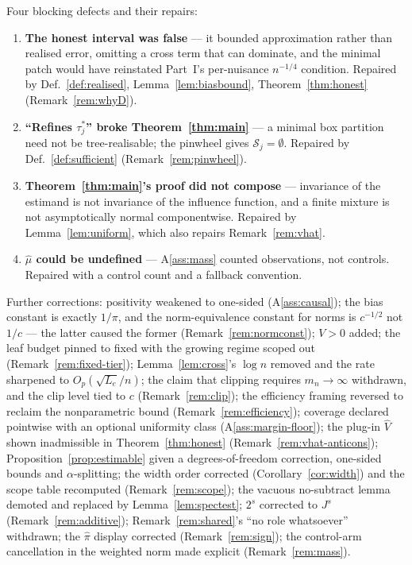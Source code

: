 \documentclass[11pt]{article}
\theoremstyle{plain}
\theoremstyle{definition}
\theoremstyle{remark}
\newcommand{\cS}{\mathcal{S}}
\newcommand{\mhat}{\widehat{\mu}}
\newcommand{\pihat}{\widehat{\pi}}
\newcommand{\Vhat}{\widehat{V}}
\begin{document}
Four blocking defects and their repairs:
\begin{enumerate}[label=\textbf{B\arabic*.},leftmargin=*,nosep]
  \item \textbf{The honest interval was false} --- it bounded approximation rather
  than realised error, omitting a cross term that can dominate, and the minimal
  patch would have reinstated Part~I's per-nuisance $n^{-1/4}$ condition. Repaired
  by Def.~\ref{def:realised}, Lemma~\ref{lem:biasbound},
  Theorem~\ref{thm:honest} (Remark~\ref{rem:whyD}).
  \item \textbf{``Refines $\tau^*_j$'' broke Theorem~\ref{thm:main}} --- a minimal
  box partition need not be tree-realisable; the pinwheel gives
  $\cS_j=\emptyset$. Repaired by Def.~\ref{def:sufficient}
  (Remark~\ref{rem:pinwheel}).
  \item \textbf{Theorem~\ref{thm:main}'s proof did not compose} --- invariance of
  the estimand is not invariance of the influence function, and a finite mixture
  is not asymptotically normal componentwise. Repaired by
  Lemma~\ref{lem:uniform}, which also repairs Remark~\ref{rem:vhat}.
  \item \textbf{$\mhat$ could be undefined} --- A\ref{ass:mass} counted
  observations, not controls. Repaired with a control count and a fallback
  convention.
\end{enumerate}

Further corrections: positivity weakened to one-sided (A\ref{ass:causal}); the
bias constant is exactly $1/\pi$, and the norm-equivalence constant for norms is
$c^{-1/2}$ not $1/c$ --- the latter caused the former
(Remark~\ref{rem:normconst}); $V>0$ added; the leaf budget pinned to fixed with
the growing regime scoped out (Remark~\ref{rem:fixed-tier});
Lemma~\ref{lem:cross}'s $\log n$ removed and the rate sharpened to
$O_p(\sqrt{L_e}/n)$; the claim that clipping requires $m_n\to\infty$ withdrawn,
and the clip level tied to $c$ (Remark~\ref{rem:clip}); the efficiency framing
reversed to reclaim the nonparametric bound (Remark~\ref{rem:efficiency});
coverage declared pointwise with an optional uniformity class
(A\ref{ass:margin-floor}); the plug-in $\Vhat$ shown inadmissible in
Theorem~\ref{thm:honest} (Remark~\ref{rem:vhat-anticons});
Proposition~\ref{prop:estimable} given a degrees-of-freedom correction, one-sided
bounds and $\alpha$-splitting; the width order corrected
(Corollary~\ref{cor:width}) and the scope table recomputed
(Remark~\ref{rem:scope}); the vacuous no-subtract lemma demoted and replaced by
Lemma~\ref{lem:spectest}; $2^s$ corrected to $J^s$ (Remark~\ref{rem:additive});
Remark~\ref{rem:shared}'s ``no role whatsoever'' withdrawn; the $\pihat$ display
corrected (Remark~\ref{rem:sign}); the control-arm cancellation in the weighted
norm made explicit (Remark~\ref{rem:mass}).
\end{document}
